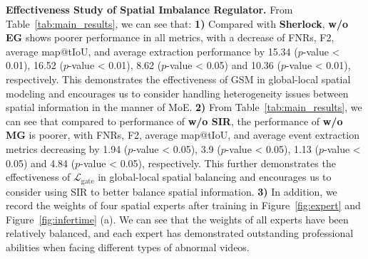 \textbf{Effectiveness Study of Spatial Imbalance Regulator.} From Table~\ref{tab:main_results}, we can see that: \textbf{1)} Compared with \textbf{Sherlock}, \textbf{w/o EG} shows poorer performance in all metrics, with a decrease of FNRs, F2, average map@tIoU, and average extraction performance by 15.34 ($p$-value < 0.01), 16.52 ($p$-value < 0.01), 8.62 ($p$-value < 0.05) and 10.36 ($p$-value < 0.01), respectively. This demonstrates the effectiveness of GSM in global-local spatial modeling and encourages us to consider handling heterogeneity issues between spatial information in the manner of MoE. 
\textbf{2)} From Table~\ref{tab:main_results}, we can see that compared to performance of \textbf{w/o SIR}, the performance of \textbf{w/o MG} is poorer, with FNRs, F2, average map@tIoU, and average event extraction metrics decreasing by 1.94 ($p$-value < 0.05), 3.9 ($p$-value < 0.05), 1.13 ($p$-value < 0.05) and 4.84 ($p$-value < 0.05), respectively. This further demonstrates the effectiveness of $\mathcal{L}_\text{gate}$ in global-local spatial balancing and encourages us to consider using SIR to better balance spatial information. 
\textbf{3)} In addition, we record the weights of four spatial experts after training in Figure~\ref{fig:expert} and Figure~\ref{fig:infertime} (a). We can see that the weights of all experts have been relatively balanced, and each expert has demonstrated outstanding professional abilities when facing different types of abnormal videos.




